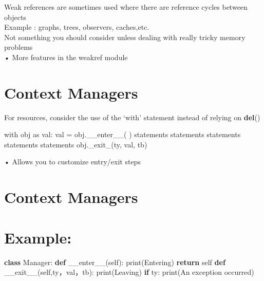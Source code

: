 \documentclass[
  letterpaper,
  DIV=11,
  numbers=noendperiod]{scrreprt}
\newenvironment{Shaded}{\begin{snugshade}}{\end{snugshade}}
\newcommand{\BuiltInTok}[1]{\textcolor[rgb]{0.00,0.23,0.31}{#1}}
\newcommand{\ControlFlowTok}[1]{\textcolor[rgb]{0.00,0.23,0.31}{\textbf{#1}}}
\newcommand{\FunctionTok}[1]{\textcolor[rgb]{0.28,0.35,0.67}{#1}}
\newcommand{\KeywordTok}[1]{\textcolor[rgb]{0.00,0.23,0.31}{\textbf{#1}}}
\newcommand{\NormalTok}[1]{\textcolor[rgb]{0.00,0.23,0.31}{#1}}
\newcommand{\StringTok}[1]{\textcolor[rgb]{0.13,0.47,0.30}{#1}}
\newcommand{\VariableTok}[1]{\textcolor[rgb]{0.07,0.07,0.07}{#1}}
\begin{document}
Weak references are sometimes used where there are reference cycles
between objects\\
Example : graphs, trees, observers, caches,etc.\\
Not something you should consider unless dealing with really tricky
memory problems\\
• More features in the weakref module


\chapter{Context Managers}\label{context-managers}

For resources, consider the use of the `with' statement instead of
relying on \textbf{del}()

\begin{Shaded}
\begin{Highlighting}[]
\NormalTok{with obj as val: val = obj.\_\_enter\_\_(  ) statements statements statements statements statements obj.\_exit\_(ty, val, tb) }
\end{Highlighting}
\end{Shaded}

• Allows you to customize entry/exit steps


\chapter{Context Managers}\label{context-managers-1}


\chapter{Example:}\label{example}

\begin{Shaded}
\begin{Highlighting}[]
\KeywordTok{class}\NormalTok{ Manager: }\KeywordTok{def} \FunctionTok{\_\_enter\_\_}\NormalTok{(}\VariableTok{self}\NormalTok{): }\BuiltInTok{print}\NormalTok{(}\StringTok{\textquotesingle{}Entering\textquotesingle{}}\NormalTok{) }\ControlFlowTok{return} \VariableTok{self} \KeywordTok{def} \FunctionTok{\_\_exit\_\_}\NormalTok{(}\VariableTok{self}\NormalTok{,ty，val，tb): }\BuiltInTok{print}\NormalTok{(}\StringTok{\textquotesingle{}Leaving\textquotesingle{}}\NormalTok{) }\ControlFlowTok{if}\NormalTok{ ty: }\BuiltInTok{print}\NormalTok{(}\StringTok{\textquotesingle{}An exception occurred\textquotesingle{}}\NormalTok{) }
\end{Highlighting}
\end{Shaded}
\end{document}
